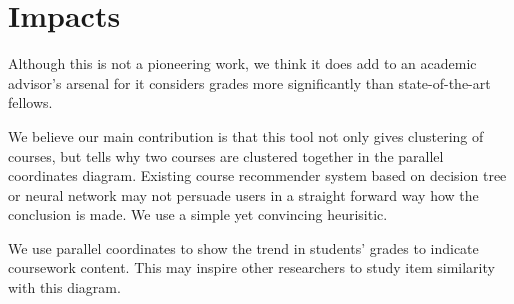 \section{Impacts}
\label{sec:impact}

Although this is not a pioneering work, we think it does add to an academic advisor's arsenal for it considers grades more significantly than state-of-the-art fellows.

We believe our main contribution is that this tool not only gives clustering of courses, but tells why two courses are clustered together in the parallel coordinates diagram. Existing course recommender system based on decision tree or neural network may not persuade users in a straight forward way how the conclusion is made. We use a simple yet convincing heurisitic.

We use parallel coordinates to show the trend in students' grades to indicate coursework content. This may inspire other researchers to study item similarity with this diagram.
